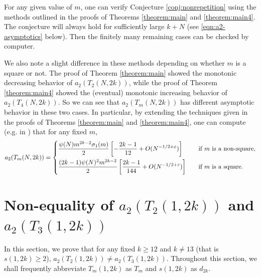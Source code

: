 \documentclass[11pt,letterpaper,reqno]{amsart}
\makeatletter
\numberwithin{figure}{section}
\numberwithin{table}{section}
\theoremstyle{definition}
\theoremstyle{plain}
\newcommand{\lrb}[1]{\left[#1\right]}
\theoremstyle{definition}
\theoremstyle{definition}
\theoremstyle{remark}
\numberwithin{equation}{section}
\def\subsection{\@startsection{subsection}{2}%
  \z@{.5\linespacing\@plus.7\linespacing}{.3\linespacing}%
  {\normalfont\bfseries}}
\makeatother
\begin{document}
For any given value of $m$, one can verify Conjecture \ref{conj:nonrepetition} using the methods outlined in the proofs of Theorems \ref{theorem:main} and \ref{theorem:main4}. The conjecture will always hold for sufficiently large $k+N$ (see \eqref{eqn:a2-asymptotics} below). Then the finitely many remaining cases can be checked by computer.

We also note a slight difference in these methods depending on whether $m$ is a square or not. The proof of Theorem \ref{theorem:main} showed the monotonic decreasing behavior of $a_2(T_2(N,2k))$, while the proof of Theorem \ref{theorem:main4} showed the (eventual) monotonic increasing behavior of $a_2(T_4(N,2k))$. 
So we can see that $a_2(T_m(N,2k))$ has different asymptotic behavior in these two cases. In particular, by extending the techniques given in the proofs of Theorems \ref{theorem:main} and \ref{theorem:main4}, one can compute (e.g. in \cite[(4.1),(4.2)]{ross-xue}) that for any fixed $m$,
\begin{align} \label{eqn:a2-asymptotics}
    a_2(T_m(N,2k)) = 
    \begin{dcases}
        \frac{\psi(N) m^{2k-2} \sigma_1(m)}{2} \lrb{ 
        -  \frac{2k-1}{12}  
         + O(N^{-1/2+\varepsilon})
        } 
        & \quad \text{if $m$ is a non-square}, \\
        \frac{(2k-1) \psi(N)^2 m^{2k-2}}{2} \lrb{ 
          \frac{2k-1}{144} + O(N^{-1/2+\varepsilon})  
        }
        & \quad \text{if $m$ is a square}.
    \end{dcases}
\end{align}










\section{Non-equality of \texorpdfstring{$a_2(T_2(1,2k))$}{} and \texorpdfstring{$a_2(T_3(1,2k))$}{}}\label{sect:T2T3}

In this section, we prove that for any fixed $k \geq 12$ and $k\ne13$ (that is $s(1,2k)\ge2$), $a_2(T_2(1,2k))\neq a_2(T_3(1,2k))$. Throughout this section, we shall frequently abbreviate $T_m(1, 2k)$ as $T_m$ and $s(1, 2k)$ as $d_{2k}$.

\end{document}
